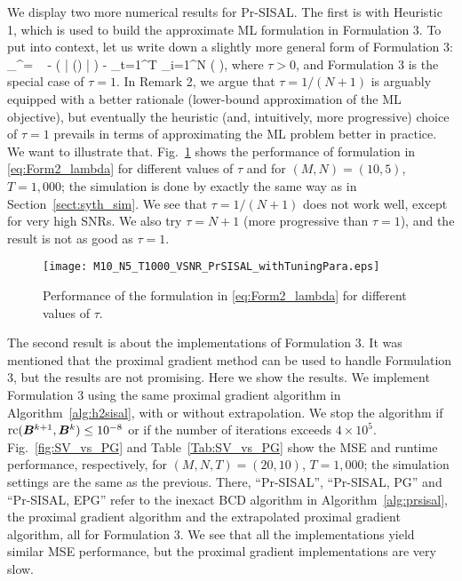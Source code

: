 \documentclass[10pt,twocolumn,twoside]{IEEEtran}
\begin{document}
We display two more numerical results for Pr-SISAL.
The first is with Heuristic 1, which is used to build the approximate ML formulation in Formulation 3.
To put into context, let us write down a slightly more general form of Formulation 3:
\beq  \label{eq:Form2_lambda}
\min_{\bB^\top \bone = \bp}   ~ - \log ( | \det(\bB) | ) -   \sum_{t=1}^T \sum_{i=1}^N \log \Phi \left(  \right),
\eeq
where $\tau > 0$, and Formulation 3 is the special case of $\tau = 1$.
In Remark 2, we argue that $\tau= 1/(N+1)$ is arguably equipped with a better rationale (lower-bound approximation of the ML objective), but eventually the heuristic (and, intuitively, more progressive) choice of $\tau =1$ prevails in terms of approximating the ML problem better in practice.
We want to illustrate that.
Fig.~\ref{fig:Pr_SISAL_Variants} shows the performance of formulation in \eqref{eq:Form2_lambda} for different values of $\tau$ and for $(M,N)= (10,5)$, $T=1,000$;
the simulation is done by exactly the same way as in Section~\ref{sect:syth_sim}.
We see that $\tau = 1/(N+1)$ does not work well, except for very high SNRs.
We also try $\tau =N+1$ (more progressive than $\tau = 1$), and the result is not as good as $\tau= 1$.

\begin{figure}[!hbt]
	\centering
	\texttt{[image: M10\_N5\_T1000\_VSNR\_PrSISAL\_withTuningPara.eps]}
	\caption{Performance of the formulation in \eqref{eq:Form2_lambda} for different values of $\tau$.}
	\label{fig:Pr_SISAL_Variants}
\end{figure}

The second result is about the implementations of Formulation 3.
It was mentioned that the proximal gradient method can be used to handle Formulation 3, but the results are not promising.
Here we show the results.
We implement Formulation 3 using the same proximal gradient algorithm in Algorithm~\ref{alg:h2sisal}, with or without extrapolation.
We stop the algorithm if ${\rm rc}({\bm B}^{k+1},{\bm B}^k) \leq 10^{-8}$ or if the number of iterations exceeds $4 \times 10^5$.
Fig.~\ref{fig:SV_vs_PG} and Table~\ref{Tab:SV_vs_PG} show the MSE and runtime performance, respectively,
for $(M,N,T)= (20,10)$, $T=1,000$;
the simulation settings are the same as the previous.
There, ``Pr-SISAL'', ``Pr-SISAL, PG'' and ``Pr-SISAL, EPG'' refer to the inexact BCD algorithm in Algorithm~\ref{alg:prsisal}, the proximal gradient algorithm and the extrapolated proximal gradient algorithm, all for Formulation 3.
We see that all the implementations yield similar MSE performance, but the proximal gradient implementations are very slow.
\end{document}
